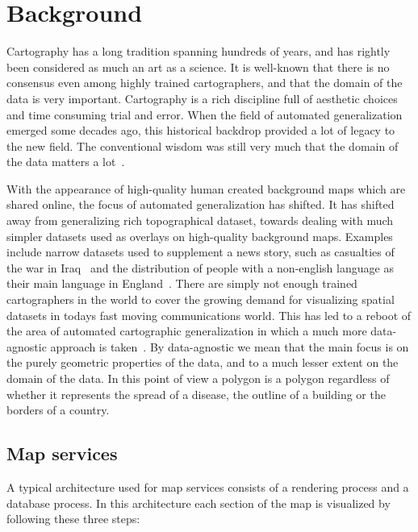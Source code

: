 \section{Background}
Cartography has a long tradition spanning hundreds of years, and has rightly been considered as much an art as a science. It is well-known that there is no consensus even among highly trained cartographers, and that the domain of the data is very important. Cartography is a rich discipline full of aesthetic choices and time consuming trial and error. When the field of automated generalization emerged some decades ago, this historical backdrop provided a lot of legacy to the new field. The conventional wisdom was still very much that the domain of the data matters a lot~\cite{a bunch of papers}.

With the appearance of high-quality human created background maps which are shared online, the focus of automated generalization has shifted. It has shifted away from generalizing rich topographical dataset, towards dealing with much simpler datasets used as overlays on high-quality background maps. Examples include narrow datasets used to supplement a news story, such as casualties of the war in Iraq~\cite{datablog1} and the distribution of people with a non-english language as their main language in England~\cite{datablog2}. There are simply not enough trained cartographers in the world to cover the growing demand for visualizing spatial datasets in todays fast moving communications world. This has led to a reboot of the area of automated cartographic generalization in which a much more data-agnostic approach is taken~\cite{fusiontables}. By data-agnostic we mean that the main focus is on the purely geometric properties of the data, and to a much lesser extent on the domain of the data. In this point of view a polygon is a polygon regardless of whether it represents the spread of a disease, the outline of a building or the borders of a country.

\subsection{Map services}

A typical architecture used for map services consists of a rendering process and a database process. In this architecture each section of the map is visualized by following these three steps:

